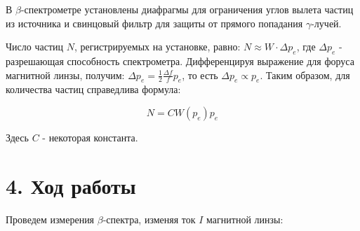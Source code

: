 \documentclass[a4paper,12pt]{report}
\begin{document}
В $\beta$-спектрометре установлены диафрагмы для ограничения углов вылета частиц из источника и свинцовый фильтр для защиты от прямого попадания $\gamma$-лучей. 

Число частиц $N$, регистрируемых на установке, равно: $N \approx W \cdot \Delta p_e$, где $\Delta p_e$ - разрешающая способность спектрометра. Дифференцируя выражение для форуса магнитной линзы, получим: $\Delta p_e = \frac{1}{2}\frac{\Delta f}{f}p_e$, то есть $\Delta p_e \propto p_e$. Таким образом, для количества частиц справедлива формула: 

\begin{equation}\label{N}
 N = CW(p_e)p_e 
\end{equation}

Здесь $C$ - некоторая константа.
\section*{4. Ход работы}
Проведем измерения $\beta$-спектра, изменяя ток $I$ магнитной линзы:
\end{document}
